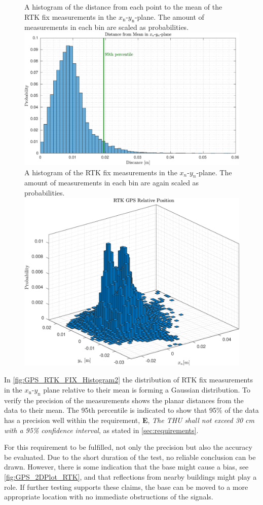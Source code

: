 \begin{figure}[H]
  \captionbox
  {
    A histogram of the distance from each point to the mean of the RTK fix measurements in the $x_\mathrm{n}$-$y_\mathrm{n}$-plane. The amount of measurements in each bin are scaled as probabilities.
    \label{fig:GPS_RTK_FIX_Histogram}
  }
  {
    \includegraphics[width=.50\textwidth]{figures/GPS_RTK_Fix_Histogram}
  }
  \hspace{5pt}
  \captionbox
  {
    A histogram of the RTK fix measurements in the $x_n$-$y_n$-plane. The amount of measurements in each bin are again scaled as probabilities.
    \label{fig:GPS_RTK_FIX_Histogram2}
  }
  {
    \includegraphics[width=.43\textwidth]{figures/GPS_RTK_Fix_Histogram2}
  }
\end{figure}

In \autoref{fig:GPS_RTK_FIX_Histogram2} the distribution of RTK fix measurements in the $x_\mathrm{n}$-$y_\mathrm{n}$ plane relative to their mean is forming a Gaussian distribution. To verify the precision of the measurements shows the planar distances from the data to their mean. The 95th percentile is indicated to show that 95$\%$ of the data has a precision well within the requirement, \textbf{E}, \emph{The THU shall not exceed 30 cm with a 95\% confidence interval}, as stated in \autoref{sec:requirements}.

For this requirement to be fulfilled, not only the precision but also the accuracy be evaluated. Due to the short duration of the test, no reliable conclusion can be drawn. However, there is some indication that the base might cause a bias, see \autoref{fig:GPS_2DPlot_RTK}, and that reflections from nearby buildings might play a role. If further testing supports these claims, the base can be moved to a more appropriate location with no immediate obstructions of the signals.


